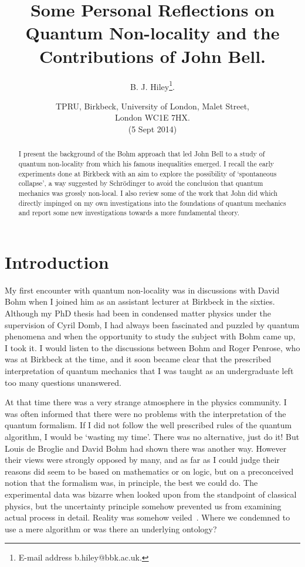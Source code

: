 \documentclass[12pt]{article}
\begin{document}
\title{Some Personal Reflections on Quantum Non-locality and the Contributions of John Bell.}
\author{B. J. Hiley\footnote{E-mail address b.hiley@bbk.ac.uk.}.}
\date{TPRU, Birkbeck, University of London, Malet Street, \\London WC1E 7HX.\\ \vspace{0.4cm}(5 Sept 2014) }
\maketitle

\begin{abstract}
I present the background of the Bohm approach that led John Bell to a study  of quantum non-locality  from which his famous inequalities emerged. I recall the early experiments done at Birkbeck with an aim to explore the possibility of `spontaneous collapse', a way suggested by Schr\"{o}dinger to avoid the conclusion that quantum mechanics was grossly non-local.  I also review some of the work that John did which directly impinged on my own investigations into the foundations of quantum mechanics and report some new investigations towards a more fundamental theory.

\end{abstract}


\section{Introduction}

My first encounter with quantum non-locality was in discussions with David Bohm when I joined him as an assistant lecturer at Birkbeck in the sixties. Although my PhD thesis  had been in condensed matter physics under the supervision of Cyril Domb,  I had always been fascinated and puzzled by quantum phenomena and when the opportunity to study the subject with Bohm came up, I took it.  I would listen to the discussions between Bohm and Roger Penrose, who was at Birkbeck at the time, and it soon became clear that  the prescribed interpretation of quantum mechanics that I was taught as an undergraduate left too many questions unanswered.  

At that time there was a very strange atmosphere in the physics community. I was often informed that there were no problems with the interpretation of the quantum formalism.  If I did not follow the well prescribed rules of the quantum algorithm, I would be `wasting my time'.  There was no alternative, just do it!  But Louis de Broglie and David Bohm had shown there was another way. However their views were strongly opposed by many, and as far as I could judge their reasons did seem to be based on mathematics or on logic, but on a preconceived notion that the formalism was, in principle, the best we could do.    The experimental data was bizarre when looked upon from the standpoint of classical physics, but the uncertainty principle somehow prevented us from examining actual process in detail.  Reality was somehow veiled~\cite {bde03}.
Where we condemned to use a mere algorithm or was there an underlying ontology? 
\end{document}
